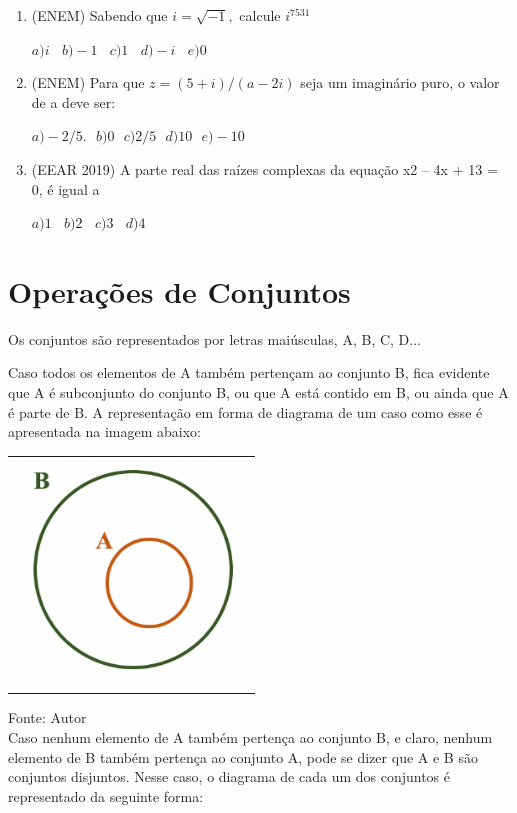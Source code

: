 \begin{multicols*}{2}
	\begin{enumerate}
	
	\item (ENEM) Sabendo que  $ i = \sqrt{-1}, $ calcule $ i^{7531}$
	
$a)  i \ \ \ \ b) -1 \ \ \ \  c) 1 \ \ \ \  d) -i \ \ \ \  e) 0$

	 \item (ENEM) Para que $z = (5 + i)/(a - 2i)$ seja um imaginário puro, o valor de a deve ser:

$a) -2/5. \ \ \  b) 0 \ \ \ c) 2/5 \ \ \  d) 10  \ \ \  e) -10 $
	
	\item (EEAR 2019) A parte real das raízes complexas da equação x2 – 4x + 13 = 0, é igual a 

$ a) 1 \ \ \ \  b) 2 \ \ \ \  c) 3 \ \ \ \  d) 4 $
	
	\end{enumerate}				
	

	\section{Operações de Conjuntos}

	Os conjuntos são representados por letras maiúsculas, A, B, C, D...		

	Caso todos os elementos de A também pertençam ao conjunto B, fica evidente que A é subconjunto do conjunto B, ou que A está contido em B, ou ainda que A é parte de B. A representação em forma de diagrama de um caso como esse é apresentada na imagem abaixo:		
	
		\begin{tabular}{@{}c@{}}
		  \includegraphics[height=60mm]{assets/Conjunto Contido.png}
		\end{tabular}
		
	Fonte: Autor\\
			
	Caso nenhum elemento de A também pertença ao conjunto B, e claro, nenhum elemento de B também pertença ao conjunto A, pode se dizer que A e B são conjuntos disjuntos. Nesse caso, o diagrama de cada um dos conjuntos é representado da seguinte forma:\\
	

\end{multicols*}
